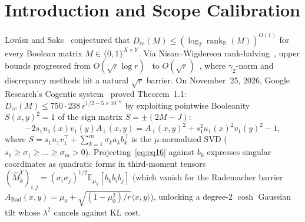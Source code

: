 \documentclass[10pt,twocolumn]{article}
\begin{document}
\section{Introduction and Scope Calibration}\label{sec:intro}
Lov\'asz and Saks~\cite{lovasz1993lattices} conjectured that $D_{\mathrm{cc}}(M) \le (\log_2 \operatorname{rank}_{\mathbb{R}}(M))^{O(1)}$ for every Boolean matrix $M\in\{0,1\}^{X\times Y}$. Via Nisan--Wigderson rank-halving~\cite{nisan1995rank}, upper bounds progressed from $O(\sqrt{r}\log r)$~\cite{lovett2016communication} to $O(\sqrt{r})$~\cite{sudakov2025matrix}, where $\gamma_2$-norm and discrepancy methods hit a natural $\sqrt{r}$ barrier. On November~25, 2026, Google Research's Cogentic system~\cite{cogentic2026logrank,cai2026cogentic} proved Theorem~1.1: $D_{\mathrm{cc}}(M) \le 750\cdot 238\, r^{1/2-5\times 10^{-6}}$ by exploiting pointwise Booleanity $S(x,y)^2 = 1$ of the sign matrix $S = \pm(2M - J)$:
\begin{equation}
-2 s_1 u_1(x) v_1(y) A_\perp(x,y) = A_\perp(x,y)^2 + s_1^2 u_1(x)^2 v_1(y)^2 - 1,
\tag{1.6}\label{eq:eq16}
\end{equation}
where $S = s_1 u_1 v_1^\top + \sum_{k=1}^m \sigma_k a_k b_k^\top$ is the $\mu$-normalized SVD ($s_1\ge\sigma_1\ge\dots\ge\sigma_m>0$). Projecting~\eqref{eq:eq16} against $b_k$ expresses singular coordinates as quadratic forms in third-moment tensors $(\widehat{M}^Y_k)_{i,j} = (\sigma_i\sigma_j)^{1/2}\mathbb{E}_{\mu_Y}[b_k b_i b_j]$ (which vanish for the Rademacher barrier $A_{\mathrm{Rad}}(x,y)=\mu_0+\sqrt{(1-\mu_0^2)/r}\langle x,y\rangle$), unlocking a degree-2 $\cosh$ Gaussian tilt whose $\lambda^2$ cancels against KL cost.
\end{document}
